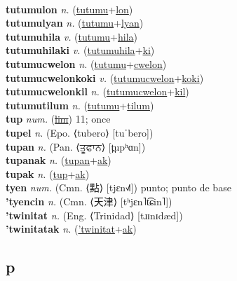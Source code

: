  \label{tutumuec} \\
\textbf{tutumulon} \textit{n.} (\hyperref[tutumu]{tutumu}+\hyperref[lon]{lon})
 \label{tutumulon} \\
\textbf{tutumulyan} \textit{n.} (\hyperref[tutumu]{tutumu}+\hyperref[lyan]{lyan})
 \label{tutumulyan} \\
\textbf{tutumuhila} \textit{v.} (\hyperref[tutumu]{tutumu}+\hyperref[hila]{hila})
 \label{tutumuhila} \\
\textbf{tutumuhilaki} \textit{v.} (\hyperref[tutumuhila]{tutumuhila}+\hyperref[ki]{ki})
 \label{tutumuhilaki} \\
\textbf{tutumucwelon} \textit{n.} (\hyperref[tutumu]{tutumu}+\hyperref[cwelon]{cwelon})
 \label{tutumucwelon} \\
\textbf{tutumucwelonkoki} \textit{v.} (\hyperref[tutumucwelon]{tutumucwelon}+\hyperref[koki]{koki})
 \label{tutumucwelonkoki} \\
\textbf{tutumucwelonkil} \textit{n.} (\hyperref[tutumucwelon]{tutumucwelon}+\hyperref[kil]{kil})
 \label{tutumucwelonkil} \\
\textbf{tutumutilum} \textit{n.} (\hyperref[tutumu]{tutumu}+\hyperref[tilum]{tilum})
 \label{tutumutilum} \\
\textbf{tup} \textit{num.} (\hyperref[lim]{\sout{lim}})
11; once \label{tup} \\
\textbf{tupel} \textit{n.} (Epo. ⟨tubero⟩ [tuˈbero])
 \label{tupel} \\
\textbf{tupan} \textit{n.} (Pan. ⟨ਤੂਫਾਨ⟩ [t̪upʰɑn])
 \label{tupan} \\
\textbf{tupanak} \textit{n.} (\hyperref[tupan]{tupan}+\hyperref[ak]{ak})
 \label{tupanak} \\
\textbf{tupak} \textit{n.} (\hyperref[tup]{tup}+\hyperref[ak]{ak})
 \label{tupak} \\
\textbf{tyen} \textit{num.} (Cmn. ⟨點⟩ [tjɛn˧˩˥])
punto; punto de base \label{tyen} \\
\textbf{'tyencin} \textit{n.} (Cmn. ⟨天津⟩ [tʰjɛn˥t͡ɕin˥])
 \label{'tyencin} \\
\textbf{'twinitat} \textit{n.} (Eng. ⟨Trinidad⟩ [tɹɪnɪdæd])
 \label{'twinitat} \\
\textbf{'twinitatak} \textit{n.} (\hyperref['twinitat]{'twinitat}+\hyperref[ak]{ak})
 \label{'twinitatak} \\
\subsection{p}

